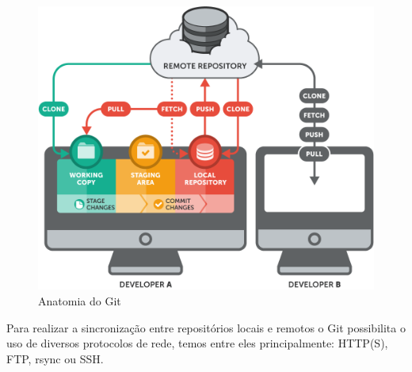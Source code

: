 	\begin{figure}[htbp]
		\caption{\label{fig_git1}Anatomia do Git}
		\begin{center}
		\includegraphics[scale=0.4]{pictures/git.png}
		\end{center}
	\end{figure}
	
	Para realizar a sincronização entre repositórios locais e remotos o Git possibilita o uso de diversos protocolos de rede, temos entre eles principalmente: HTTP(S), FTP, rsync ou SSH.
	
